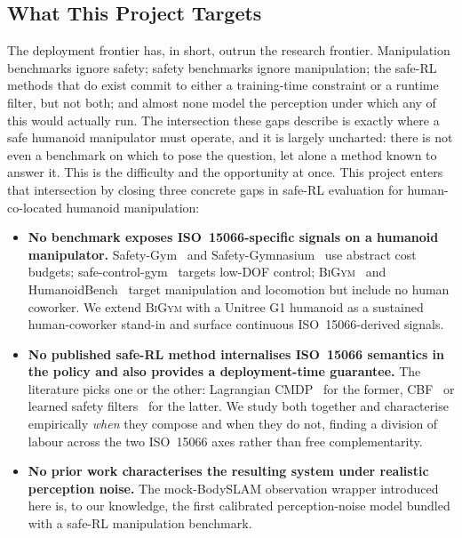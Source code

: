 \documentclass[11pt,a4paper]{report}
\newcommand{\iso}{ISO~15066}
\newcommand{\bigym}{\textsc{BiGym}}
\newcommand{\bodyslampp}{BodySLAM\nolinebreak[4]\hspace{-.05em}\raisebox{.2ex}{\scriptsize ++}}
\begin{document}
\subsection{What This Project Targets}
\label{sec:intro:mot:targets}

The deployment frontier has, in short, outrun the research frontier.
Manipulation benchmarks ignore safety; safety benchmarks ignore
manipulation; the safe-RL methods that do exist commit to either a
training-time constraint or a runtime filter, but not both; and almost
none model the perception under which any of this would actually run.
The intersection these gaps describe is exactly where a safe humanoid
manipulator must operate, and it is largely uncharted: there is not
even a benchmark on which to pose the question, let alone a method
known to answer it. This is the difficulty and the opportunity at once.
This project enters that intersection by closing three concrete gaps in
safe-RL evaluation for human-co-located humanoid manipulation:

\begin{itemize}[topsep=2pt,itemsep=2pt]
\item \textbf{No benchmark exposes \iso{}-specific signals on a
  humanoid manipulator.} Safety-Gym~\cite{ray2019safetygym} and
  Safety-Gymnasium~\cite{ji2023safetygymnasium} use abstract cost
  budgets; safe-control-gym~\cite{yuan2022safecontrolgym} targets
  low-DOF control; \bigym{}~\cite{chernyadev2024bigym} and
  HumanoidBench~\cite{sferrazza2024humanoidbench} target manipulation
  and locomotion but include no human coworker. We extend
  \bigym{} with a Unitree G1 humanoid as a sustained human-coworker
  stand-in and surface continuous \iso{}-derived signals.
\item \textbf{No published safe-RL method internalises \iso{}
  semantics in the policy and also provides a deployment-time
  guarantee.} The literature picks one or the other: Lagrangian
  CMDP~\cite{ray2019safetygym,stooke2020pid} for the former,
  CBF~\cite{ames2019cbf,shield2025} or learned safety
  filters~\cite{srinivasan2020learning,thananjeyan2021recovery} for
  the latter. We study both together and characterise empirically
  \emph{when} they compose and when they do not, finding a division of
  labour across the two \iso{} axes rather than free complementarity.
\item \textbf{No prior work characterises the resulting system
  under realistic perception noise.} The mock-\bodyslampp{}
  observation wrapper introduced here is, to our knowledge, the
  first calibrated perception-noise model bundled with a safe-RL
  manipulation benchmark.
\end{itemize}
\end{document}
